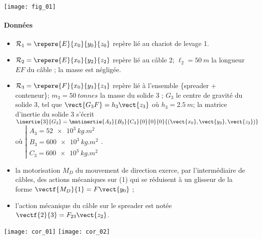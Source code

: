\begin{marginfigure}
\texttt{[image: fig\_01]}
\end{marginfigure}

\paragraph*{Données}
\begin{itemize}
\item $\mathcal{R}_1=\repere{E}{x_0}{y_0}{z_0}$  repère lié au chariot de levage 1.
\item $\mathcal{R}_2=\repere{E}{x_0}{y_2}{z_2}$  repère lié au câble 2; $\ell_2 = \SI{50}{m}$ la longueur $EF$
du câble ; la masse est négligée.
\item $\mathcal{R}_3=\repere{F}{x_0}{y_3}{z_3}$  repère lié à l’ensemble \{spreader + conteneur\};
$m_3 = \SI{50}{tonnes}$ la masse du solide 3 ; $G_3$ le centre de gravité du
solide 3, tel que $\vect{G_3F}=h_3\vect{z_3}$ où $h_3 = \SI{2,5}{m}$; la matrice d’inertie du solide 3 s’écrit
$\inertie{3}{G_3}=\matinertie{A_3}{B_3}{C_3}{0}{0}{0}{\left(\vect{x_0},\vect{y_3},\vect{z_3} \right)}$ où $\left| \begin{array}{l} A_3 = \SI{52e3}{kg.m^2} \\ B_3 = \SI{600e3}{kg.m^2} \\ C_3 = \SI{600e3}{kg.m^2} \end{array}\right.$. 
\item la motorisation $M_D$ du mouvement de direction exerce, par l’intermédiaire de câbles, des actions mécaniques sur (1) qui se réduisent
à un glisseur de la forme $\vectf{M_D}{1} =F \vect{y_0}$ ;
\item l’action mécanique du câble sur le spreader est notée $\vectf{2}{3} =F_{23} \vect{z_2}$.
\end{itemize}




\fi

\ifprof

\begin{marginfigure}
\centering
\texttt{[image: cor\_01]}
\texttt{[image: cor\_02]}
\end{marginfigure}

